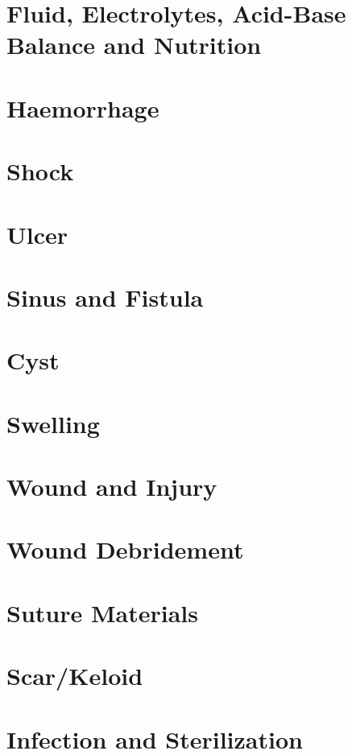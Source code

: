 \documentclass[11pt, a4paper]{article}
\begin{document}
\section{Fluid, Electrolytes, Acid-Base Balance and Nutrition}

\section{Haemorrhage}

\section{Shock}

\section{Ulcer}

\section{Sinus and Fistula}

\section{Cyst}

\section{Swelling}

\section{Wound and Injury}

\section{Wound Debridement}

\section{Suture Materials}

\section{Scar/Keloid}

\section{Infection and Sterilization}
\end{document}

